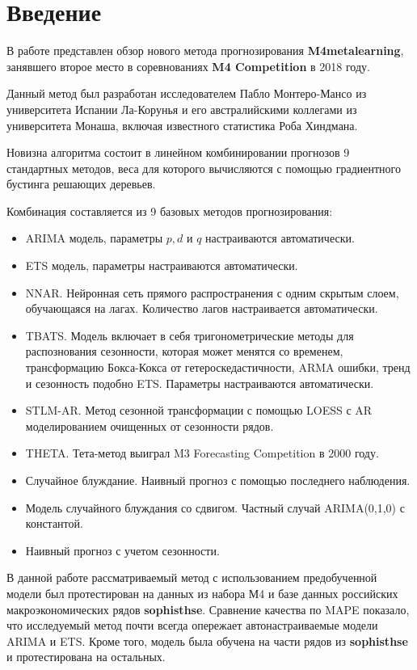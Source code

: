 \documentclass[a4paper,12pt]{article}
\theoremstyle{plain} %
\theoremstyle{definition} %
\theoremstyle{remark} %
\begin{document}
\tableofcontents

\newpage
\section{Введение}

В работе представлен обзор нового метода прогнозирования \textbf{M4metalearning}, занявшего второе место в соревнованиях \textbf{M4 Competition} в 2018 году.

Данный метод был разработан исследователем Пабло Монтеро-Мансо из университета Испании Ла-Корунья и его австралийскими коллегами из университета Монаша, включая известного статистика Роба Хиндмана.

Новизна алгоритма состоит в линейном комбинировании прогнозов 9 стандартных методов, веса для которого вычисляются с помощью градиентного бустинга решающих деревьев.

Комбинация составляется из 9 базовых методов прогнозирования:
\begin{itemize}
	\item ARIMA модель, параметры $p, d$ и $q$ настраиваются автоматически.
  \item ETS модель, параметры настраиваются автоматически.
  \item NNAR. Нейронная сеть прямого распространения с одним скрытым слоем, обучающаяся на лагах. Количество лагов настраивается автоматически.
  \item TBATS.  Модель включает в себя тригонометрические методы для распознования сезонности, которая может менятся со временем, трансформацию Бокса-Кокса от гетероскедастичности, ARMA ошибки, тренд и сезонность подобно ETS. Параметры настраиваются автоматически.
  \item STLM-AR. Метод сезонной трансформации с помощью LOESS с AR моделированием очищенных от сезонности рядов.
  \item THETA. Тета-метод выиграл M3 Forecasting Competition в 2000 году.
  \item Случайное блуждание. Наивный прогноз с помощью последнего наблюдения.
  \item Модель случайного блуждания со сдвигом. Частный случай ARIMA(0,1,0) с константой.
  \item Наивный прогноз с учетом сезонности.

\end{itemize}

В данной работе рассматриваемый метод с использованием предобученной модели был протестирован на данных из набора М4 и базе данных российских макроэкономических рядов \textbf{sophisthse}.
Сравнение качества по MAPE показало, что исследуемый метод почти всегда опережает автонастраиваемые модели ARIMA и ETS.
Кроме того, модель была обучена на части рядов из \textbf{sophisthse} и протестирована на остальных.
\end{document}

